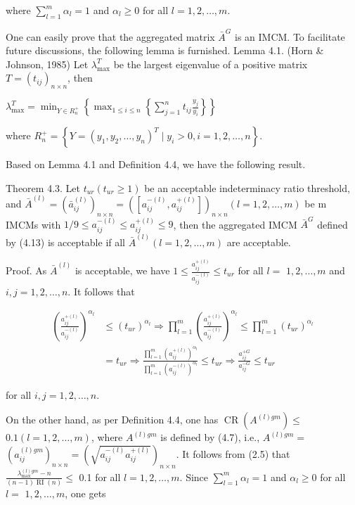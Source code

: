 \documentclass[10pt]{article}
\begin{document}
where $\sum_{l=1}^{m} \alpha_{l}=1$ and $\alpha_{l} \geq 0$ for all $l=1,2, \ldots, m$.

One can easily prove that the aggregated matrix $\bar{A}^{G}$ is an IMCM. To facilitate future discussions, the following lemma is furnished.
Lemma 4.1. (Horn \& Johnson, 1985) Let $\lambda_{\max }^{T}$ be the largest eigenvalue of a positive matrix $T=\left(t_{i j}\right)_{n \times n}$, then

$\lambda_{\max }^{T}=\min _{Y \in R_{n}^{+}}\left\{\max _{1 \leq i \leq n}\left\{\sum_{j=1}^{n} t_{i j} \frac{y_{j}}{y_{i}}\right\}\right\}$

where $R_{n}^{+}=\left\{Y=\left(y_{1}, y_{2}, \ldots, y_{n}\right)^{T} \mid y_{i}>0, i=1,2, \ldots, n\right\}$.

Based on Lemma 4.1 and Definition 4.4, we have the following result.

Theorem 4.3. Let $t_{u r}\left(t_{u r} \geq 1\right)$ be an acceptable indeterminacy ratio threshold, and $\bar{A}^{(l)}=\left(\bar{a}_{i j}^{(l)}\right)_{n \times n}=\left(\left[a_{i j}^{-(l)}, a_{i j}^{+(l)}\right]\right)_{n \times n}(l=1,2, \ldots, m)$ be m IMCMs with $1 / 9 \leq a_{i j}^{-(l)} \leq a_{i j}^{+(l)} \leq 9$, then the aggregated IMCM $\bar{A}^{G}$ defined by (4.13) is acceptable if all $\bar{A}^{(l)}(l=1,2, \ldots, m)$ are acceptable.

Proof. As $\bar{A}^{(l)}$ is acceptable, we have $1 \leq \frac{a_{i j}^{+(l)}}{a_{i j}^{-(l)}} \leq t_{u r}$ for all $l=$ $1,2, \ldots, m$ and $i, j=1,2, \ldots, n$. It follows that

$$
\begin{aligned}
\left(\frac{a_{i j}^{+(l)}}{a_{i j}^{-(l)}}\right)^{\alpha_{l}} & \leq\left(t_{u r}\right)^{\alpha_{l}} \Rightarrow \prod_{l=1}^{m}\left(\frac{a_{i j}^{+(l)}}{a_{i j}^{-(l)}}\right)^{\alpha_{l}} \leq \prod_{l=1}^{m}\left(t_{u r}\right)^{\alpha_{l}} \\
& =t_{u r} \Rightarrow \frac{\prod_{l=1}^{m}\left(a_{i j}^{+(l)}\right)^{\alpha_{l}}}{\prod_{l=1}^{m}\left(a_{i j}^{-(l)}\right)^{\alpha_{l}}} \leq t_{u r} \Rightarrow \frac{a_{i j}^{+G}}{a_{i j}^{-G}} \leq t_{u r}
\end{aligned}
$$

for all $i, j=1,2, \ldots, n$.

On the other hand, as per Definition 4.4, one has $\operatorname{CR}\left(A^{(l) g m}\right) \leq$ $0.1(l=1,2, \ldots, m)$, where $A^{(l) g m}$ is defined by (4.7), i.e., $A^{(l) g m}=$ $\left(a_{i j}^{(l) g m}\right)_{n \times n}=\left(\sqrt{a_{i j}^{-(l)} a_{i j}^{+(l)}}\right)_{n \times n}$. It follows from (2.5) that $\frac{\lambda_{\max }^{(l) g m}-n}{(n-1) \operatorname{RI}(n)} \leq$ 0.1 for all $l=1,2, \ldots, m$. Since $\sum_{l=1}^{m} \alpha_{l}=1$ and $\alpha_{l} \geq 0$ for all $l=$ $1,2, \ldots, m$, one gets
\end{document}
